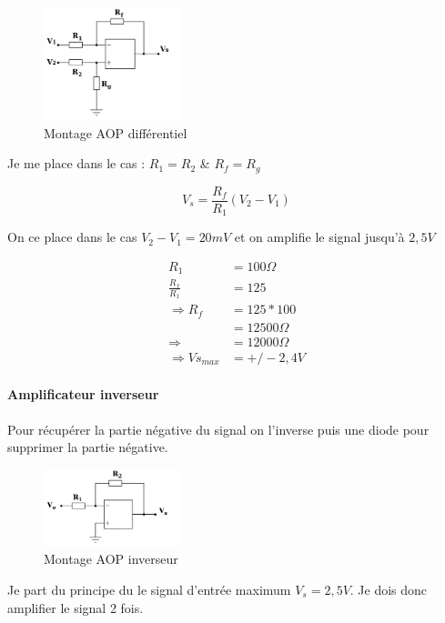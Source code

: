 \documentclass[11pt]{article}
\begin{document}
\begin{figure}[!h]
	\centering
	\includegraphics[width=150px]{AOP_dif.png}
	\caption{Montage AOP différentiel}
\end{figure}
\FloatBarrier

Je me place dans le cas : $R_{1} = R_{2}$ \&  $R_{f} = R_{g}$   

\begin{equation}
	V_{s} = \frac{R_{f}}{R_{1}}(V_{2}-V_{1})
\end{equation}

On ce place dans le cas $V_{2}-V_{1} = 20mV$ et on amplifie le signal jusqu'à $2,5V$
		
\begin{equation}
	 \begin{split}
		R_{1} &= 100 \Omega\\
		\frac{R_{f}}{R_{1}} &= 125\\
		\Rightarrow R_{f} &= 125*100\\
		&= 12500 \Omega\\
		\Rightarrow &= 12000 \Omega\\
		\Rightarrow Vs_{max} &= +/-2,4V 
	\end{split}
\end{equation}

\paragraph{Amplificateur inverseur}

Pour récupérer la partie négative du signal on l'inverse puis une diode pour supprimer la partie négative.

\begin{figure}[!h]
	\centering
	\includegraphics[width=150px]{AOP_inv.png}
	\caption{Montage AOP inverseur}
\end{figure}
\FloatBarrier

Je part du principe du le signal d'entrée maximum $V_{s} = 2,5V$. Je dois donc amplifier le signal 2 fois.
\end{document}
